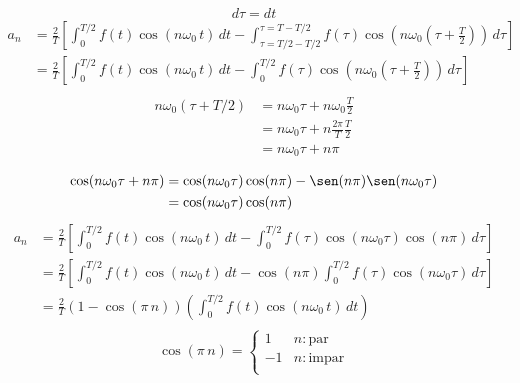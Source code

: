 \begin{equation*}
    d\tau=dt
\end{equation*}
\begin{equation*}
\begin{split}
    a_n
        &=\frac{2}{T}\left[
            \int_0^{T/2}f(t)\cos(n\omega_0\,t)\,dt-
            \int_{\tau=T/2-T/2}^{\tau=T-T/2}
                f(\tau)\cos(n\omega_0(\tau+\frac{T}{2}))\,d\tau
        \right]\\
        &=\frac{2}{T}\left[
            \int_0^{T/2}f(t)\cos(n\omega_0\,t)\,dt-
            \int_0^{T/2}f(\tau)\cos(n\omega_0(\tau+\frac{T}{2}))\,d\tau
        \right]\\
\end{split}
\end{equation*}
\begin{equation*}
\begin{split}
    n\omega_0(\tau+T/2)
        &=n\omega_0\tau+n\omega_0\frac{T}{2}\\
        &=n\omega_0\tau+n\frac{2\pi}{T}\frac{T}{2}\\
        &=n\omega_0\tau+n\pi\\
\end{split}
\end{equation*}
\begin{equation*}
\begin{split}
    \cos(n\omega_0\tau+n\pi)
        &=\cos(n\omega_0\tau)\cos(n\pi)-\sen(n\pi)\sen(n\omega_0\tau)\\
        &=\cos(n\omega_0\tau)\cos(n\pi)\\
\end{split}
\end{equation*}
\begin{equation*}
\begin{split}
    a_n
        &=\frac{2}{T}\left[
            \int_0^{T/2}f(t)\cos(n\omega_0\,t)\,dt-
            \int_0^{T/2}f(\tau)\cos(n\omega_0\tau)\cos(n\pi)\,d\tau
        \right]\\
        &=\frac{2}{T}\left[
            \int_0^{T/2}f(t)\cos(n\omega_0\,t)\,dt-\cos(n\pi)\int_0^{T/2}
                f(\tau)\cos(n\omega_0\tau)\,d\tau
        \right]\\
        &=\frac{2}{T}(1-\cos(\pi\,n))\left(
            \int_0^{T/2}f(t)\cos(n\omega_0\,t)\,dt
        \right)\\
\end{split}
\end{equation*}
\begin{equation*}
    \cos(\pi\,n)=\begin{cases}
        1&n:\text{par}\\
        -1&n:\text{impar}\\
    \end{cases}
\end{equation*}
